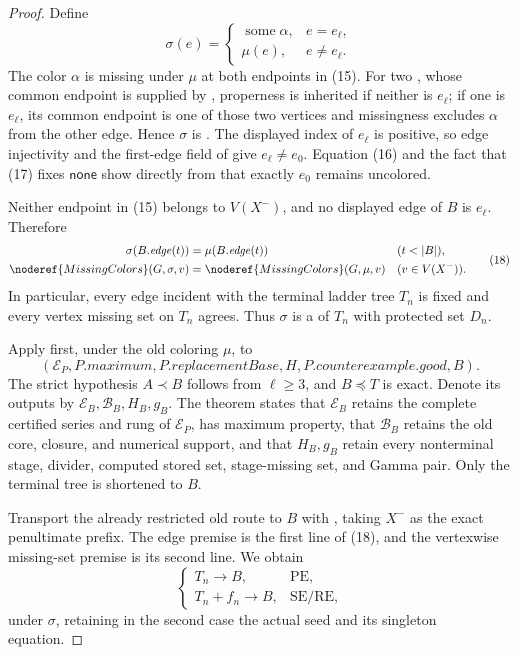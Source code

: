 \begin{proof}
Define
\[
 \sigma(e)=
 \begin{cases}
   \operatorname{some}\alpha,&e=e_\ell,\\
   \mu(e),&e\ne e_\ell.
 \end{cases}                                                   \tag{17}
\]
The color \(\alpha\) is missing under \(\mu\) at both endpoints in (15).
For two , whose common endpoint is supplied by
, properness is inherited if neither is
\(e_\ell\); if one is \(e_\ell\), its common endpoint is one of those two
vertices and missingness excludes \(\alpha\) from the other edge.  Hence
\(\sigma\) is .  The displayed index of
\(e_\ell\) is positive, so edge injectivity and the first-edge field of
 give \(e_\ell\ne e_0\).  Equation (16) and the fact
that (17) fixes \(\mathsf{none}\) show directly from
 that exactly \(e_0\) remains uncolored.

Neither endpoint in (15) belongs to \(V(X^-)\), and no displayed edge of
\(B\) is \(e_\ell\).  Therefore
\[
 \begin{aligned}
 \sigma(B.\mathit{edge}(t))&=\mu(B.\mathit{edge}(t))
                                      &&(t<|B|),\\
 \noderef{MissingColors}(G,\sigma,v)&=
       \noderef{MissingColors}(G,\mu,v)&& (v\in V(X^-)).
 \end{aligned}                                                 \tag{18}
\]
In particular, every edge incident with the terminal ladder tree \(T_n\)
is fixed and every vertex missing set on \(T_n\) agrees.  Thus \(\sigma\)
is a  of \(T_n\) with protected set \(D_n\).

Apply  first, under the old
coloring \(\mu\), to
\[
 (\mathcal E_P,P.\mathit{maximum},P.\mathit{replacementBase},H,
   P.\mathit{counterexample}.\mathit{good},B).
\]
The strict hypothesis \(A\prec B\) follows from \(\ell\geq3\), and
\(B\preccurlyeq T\) is exact.  Denote its outputs by
\(\mathcal E_B,\mathcal B_B,H_B,g_B\).  The theorem states that
\(\mathcal E_B\) retains the complete certified series and rung of
\(\mathcal E_P\), has maximum property, that \(\mathcal B_B\) retains the
old core, closure, and numerical support, and that \(H_B,g_B\) retain every
nonterminal stage, divider, computed stored set, stage-missing set, and
Gamma pair.  Only the terminal tree is shortened to \(B\).

Transport the already restricted old route to \(B\) with
, taking \(X^-\)
as the exact penultimate prefix.  The edge premise is the first line of
(18), and the vertexwise missing-set premise is its second line.  We obtain
\[
 \begin{cases}
 T_n\longrightarrow B,&\text{PE},\\
 T_n+f_n\longrightarrow B,&\text{SE/RE},
 \end{cases}                                                   \tag{19}
\]
under \(\sigma\), retaining in the second case the actual seed and its
singleton equation.


\end{proof}
